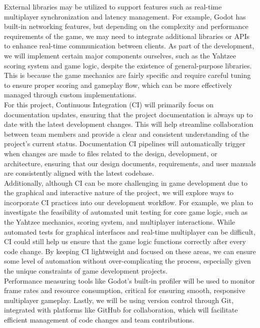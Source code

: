 \documentclass{article}
\begin{document}
External libraries may be utilized to support features such as real-time multiplayer synchronization and latency management. For example, Godot has built-in networking features, but depending on the complexity and performance requirements of the game, we may need to integrate additional libraries or APIs to enhance real-time communication between clients. As part of the development, we will implement certain major components ourselves, such as the Yahtzee scoring system and game logic, despite the existence of general-purpose libraries. This is because the game mechanics are fairly specific and require careful tuning to ensure proper scoring and gameplay flow, which can be more effectively managed through custom implementations. \\

For this project, Continuous Integration (CI) will primarily focus on documentation updates, ensuring that the project documentation is always up to date with the latest development changes. This will help streamline collaboration between team members and provide a clear and consistent understanding of the project’s current status. Documentation CI pipelines will automatically trigger when changes are made to files related to the design, development, or architecture, ensuring that our design documents, requirements, and user manuals are consistently aligned with the latest codebase. \\

Additionally, although CI can be more challenging in game development due to the graphical and interactive nature of the project, we will explore ways to incorporate CI practices into our development workflow. For example, we plan to investigate the feasibility of automated unit testing for core game logic, such as the Yahtzee mechanics, scoring system, and multiplayer interactions. While automated tests for graphical interfaces and real-time multiplayer can be difficult, CI could still help us ensure that the game logic functions correctly after every code change. By keeping CI lightweight and focused on these areas, we can ensure some level of automation without over-complicating the process, especially given the unique constraints of game development projects. \\

Performance measuring tools like Godot's built-in profiler will be used to monitor frame rates and resource consumption, critical for ensuring smooth, responsive multiplayer gameplay. Lastly, we will be using version control through Git, integrated with platforms like GitHub for collaboration, which will facilitate efficient management of code changes and team contributions. \\
\end{document}
